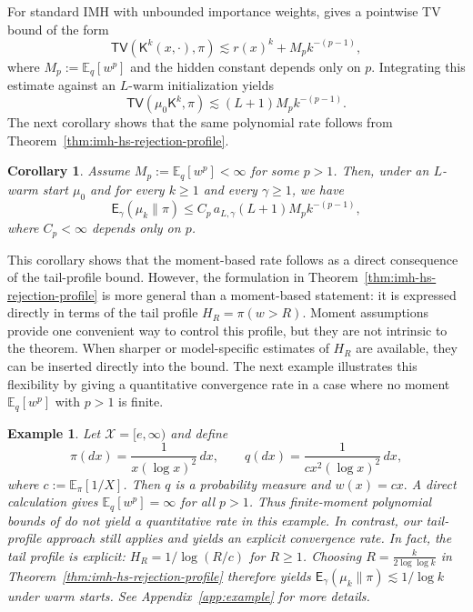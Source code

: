 \documentclass[10pt, journal]{IEEEtran}
\newcommand{\sK}{\mathsf{K}}
\newtheorem{example}{Example}
\newtheorem{corollary}{Corollary}
\begin{document}
For standard IMH with unbounded importance weights, \cite[Proposition~4.4]{deligiannidis2024importance} gives a pointwise TV bound of the form
$$\mathsf{TV}(\sK^k(x,\cdot),\pi)\lesssim r(x)^k+M_p k^{-(p-1)},$$
where $M_p:=\mathbb E_q[w^p]$ and the hidden constant depends only on $p$. Integrating this estimate against an $L$-warm initialization yields
$$\mathsf{TV}(\mu_0\sK^k,\pi)\lesssim (L+1)M_p k^{-(p-1)}.$$
The next corollary shows that the same polynomial rate follows from Theorem~\ref{thm:imh-hs-rejection-profile}.
\begin{corollary}\label{cor:imh-moment}
Assume $M_p:=\mathbb E_q[w^p]<\infty$ for some $p>1$. Then, under an $L$-warm start $\mu_0$ and for every $k\ge 1$ and every $\gamma\ge 1$, we have 
$$\mathsf E_\gamma(\mu_k\|\pi)\le C_p\,a_{L,\gamma}(L+1)M_p k^{-(p-1)},$$
where $C_p<\infty$ depends only on $p$.
\end{corollary}

This corollary shows that the moment-based rate follows as a direct consequence of the tail-profile bound. However, the formulation in Theorem~\ref{thm:imh-hs-rejection-profile} is more general than a moment-based statement: it is expressed directly in terms of the tail profile $H_R=\pi(w>R)$. Moment assumptions provide one convenient way to control this profile, but they are not intrinsic to the theorem. When sharper or model-specific estimates of $H_R$ are available, they can be inserted directly into the bound. The next example illustrates this flexibility by giving a quantitative convergence rate in a case where no moment $\mathbb E_q[w^p]$ with $p>1$ is finite.

\begin{example}\label{ex:no-finite-moment-imh}
Let $\mathcal X=[e,\infty)$ and define
$$\pi(dx)=\frac{1}{x(\log x)^2}\,dx,\qquad q(dx)=\frac{1}{c x^2(\log x)^2}\,dx,$$
where $c:=\mathbb E_\pi[1/X]$. Then $q$ is a probability measure and
$w(x)=cx.$
A direct calculation gives $\mathbb E_q[w^p]=\infty$ for all $p>1$.
Thus finite-moment polynomial bounds of \cite{deligiannidis2024importance} do not yield a quantitative rate in this example. In contrast, our tail-profile approach still applies and yields an explicit convergence rate. In fact, the tail profile is explicit: $H_R= 1/\log(R/c)$ for $R\geq 1$. Choosing $R = \frac{k}{2\log\log k}$ in Theorem~\ref{thm:imh-hs-rejection-profile} therefore yields $\mathsf E_\gamma(\mu_k\|\pi)\lesssim 1/\log k$ under warm starts. See Appendix~\ref{app:example} for more details.  
\end{example}
\end{document}
